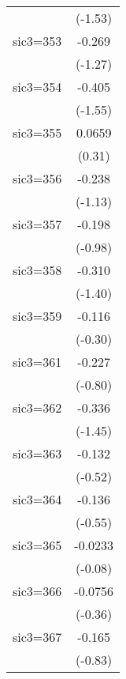 \begin{table}[htbp]
\begin{tabular*}{0.8\hsize}{@{\hskip\tabcolsep\extracolsep\fill}l*{1}{c}}
                    &     (-1.53)         \\
\addlinespace
sic3=353            &      -0.269         \\
                    &     (-1.27)         \\
\addlinespace
sic3=354            &      -0.405         \\
                    &     (-1.55)         \\
\addlinespace
sic3=355            &      0.0659         \\
                    &      (0.31)         \\
\addlinespace
sic3=356            &      -0.238         \\
                    &     (-1.13)         \\
\addlinespace
sic3=357            &      -0.198         \\
                    &     (-0.98)         \\
\addlinespace
sic3=358            &      -0.310         \\
                    &     (-1.40)         \\
\addlinespace
sic3=359            &      -0.116         \\
                    &     (-0.30)         \\
\addlinespace
sic3=361            &      -0.227         \\
                    &     (-0.80)         \\
\addlinespace
sic3=362            &      -0.336         \\
                    &     (-1.45)         \\
\addlinespace
sic3=363            &      -0.132         \\
                    &     (-0.52)         \\
\addlinespace
sic3=364            &      -0.136         \\
                    &     (-0.55)         \\
\addlinespace
sic3=365            &     -0.0233         \\
                    &     (-0.08)         \\
\addlinespace
sic3=366            &     -0.0756         \\
                    &     (-0.36)         \\
\addlinespace
sic3=367            &      -0.165         \\
                    &     (-0.83)         \\

\end{tabular*}
\end{table}
